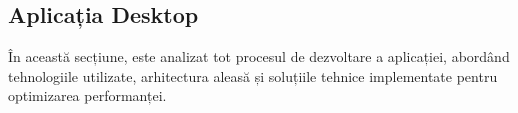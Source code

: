    \subsection{Aplicația Desktop}
    În această secțiune, este analizat tot procesul de dezvoltare a aplicației, abordând tehnologiile utilizate, arhitectura aleasă și soluțiile tehnice implementate pentru optimizarea performanței. 






